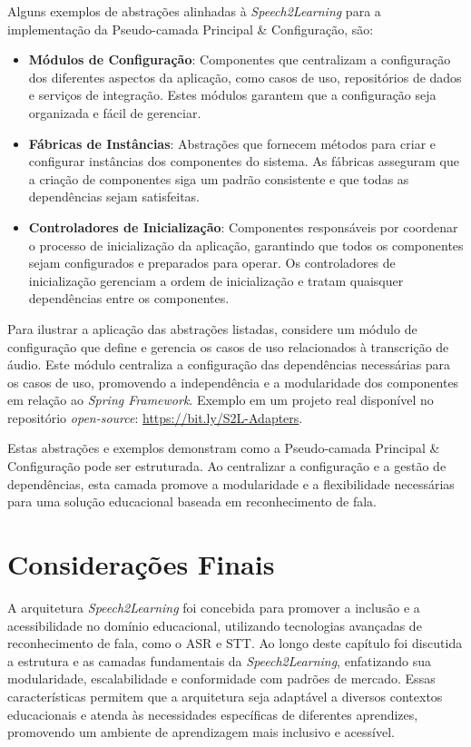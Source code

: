 Alguns exemplos de abstrações alinhadas à \textit{Speech2Learning} para a implementação da Pseudo-camada Principal \& Configuração, são:

\begin{itemize}
    \item \textbf{Módulos de Configuração}: Componentes que centralizam a configuração dos diferentes aspectos da aplicação, como casos de uso, repositórios de dados e serviços de integração. Estes módulos garantem que a configuração seja organizada e fácil de gerenciar.

    \item \textbf{Fábricas de Instâncias}: Abstrações que fornecem métodos para criar e configurar instâncias dos componentes do sistema. As fábricas asseguram que a criação de componentes siga um padrão consistente e que todas as dependências sejam satisfeitas.

    \item \textbf{Controladores de Inicialização}: Componentes responsáveis por coordenar o processo de inicialização da aplicação, garantindo que todos os componentes sejam configurados e preparados para operar. Os controladores de inicialização gerenciam a ordem de inicialização e tratam quaisquer dependências entre os componentes.
\end{itemize}

Para ilustrar a aplicação das abstrações listadas, considere um módulo de configuração que define e gerencia os casos de uso relacionados à transcrição de áudio. Este módulo centraliza a configuração das dependências necessárias para os casos de uso, promovendo a independência e a modularidade dos componentes em relação ao \textit{Spring Framework}. Exemplo em um projeto real disponível no repositório \textit{open-source}: \url{https://bit.ly/S2L-Adapters}.

Estas abstrações e exemplos demonstram como a Pseudo-camada Principal \& Configuração pode ser estruturada. Ao centralizar a configuração e a gestão de dependências, esta camada promove a modularidade e a flexibilidade necessárias para uma solução educacional baseada em reconhecimento de fala.

\section{Considerações Finais}

A arquitetura \textit{Speech2Learning} foi concebida para promover a inclusão e a acessibilidade no domínio educacional, utilizando tecnologias avançadas de reconhecimento de fala, como o ASR e STT. Ao longo deste capítulo foi discutida a estrutura e as camadas fundamentais da \textit{Speech2Learning}, enfatizando sua modularidade, escalabilidade e conformidade com padrões de mercado. Essas características permitem que a arquitetura seja adaptável a diversos contextos educacionais e atenda às necessidades específicas de diferentes aprendizes, promovendo um ambiente de aprendizagem mais inclusivo e acessível.

